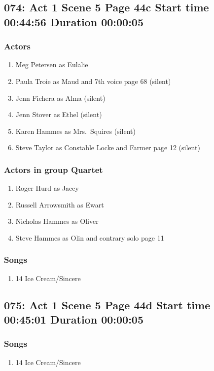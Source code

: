 \subsection{074: Act 1 Scene 5 Page 44c Start time 00:44:56 Duration 00:00:05}

\subsubsection{Actors}
\begin{enumerate}
\item Meg Petersen as Eulalie
\item Paula Troie as Maud and 7th voice page 68 (silent)
\item Jenn Fichera as Alma (silent)
\item Jenn Stover as Ethel (silent)
\item Karen Hammes as Mrs.~Squires (silent)
\item Steve Taylor as Constable Locke and Farmer page 12 (silent)
\end{enumerate}
\subsubsection{Actors in group Quartet}
\begin{enumerate}
\item Roger Hurd as Jacey
\item Russell Arrowsmith as Ewart
\item Nicholas Hammes as Oliver
\item Steve Hammes as Olin and contrary solo page 11
\end{enumerate}

\subsubsection{Songs}
\begin{enumerate}
\item 14 Ice Cream/Sincere
\end{enumerate}
\subsection{075: Act 1 Scene 5 Page 44d Start time 00:45:01 Duration 00:00:05}
\subsubsection{Songs}
\begin{enumerate}
\item 14 Ice Cream/Sincere
\end{enumerate}
